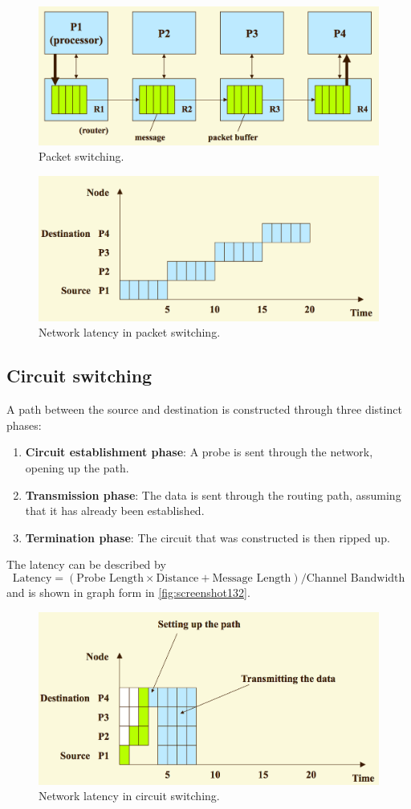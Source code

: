 \begin{figure}
\centering
\includegraphics[width=0.7\linewidth]{figures/screenshot128}
\caption{Packet switching.}
\label{fig:screenshot128}
\end{figure}

\begin{figure}
\centering
\includegraphics[width=0.7\linewidth]{figures/screenshot131}
\caption{Network latency in packet switching.}
\label{fig:screenshot131}
\end{figure}

\subsection{Circuit switching}
A path between the source and destination is constructed through three distinct phases: \begin{enumerate}
\item \textbf{Circuit establishment phase}: A probe is sent through the network, opening up the path.
\item \textbf{Transmission phase}: The data is sent through the routing path, assuming that it has already been established.
\item \textbf{Termination phase}: The circuit that was constructed is then ripped up.
\end{enumerate}

The latency can be described by
\[ \text{Latency} =  (\text{Probe Length} \times \text{Distance} + \text{Message Length})/\text{Channel Bandwidth} \]
and is shown in graph form in \autoref{fig:screenshot132}.

\begin{figure}
\centering
\includegraphics[width=0.7\linewidth]{figures/screenshot132}
\caption{Network latency in circuit switching.}
\label{fig:screenshot132}
\end{figure}



